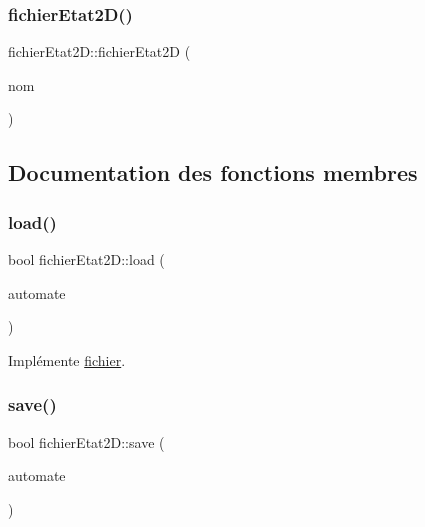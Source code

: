 \subsubsection{\texorpdfstring{fichier\+Etat2\+D()}{fichierEtat2D()}}
{\footnotesize\ttfamily fichier\+Etat2\+D\+::fichier\+Etat2D (\begin{DoxyParamCaption}\item[{const std\+::string}]{nom }\end{DoxyParamCaption})\hspace{0.3cm}{\ttfamily [inline]}}



\subsection{Documentation des fonctions membres}
\mbox{\label{classfichier_etat2_d_a1509a84b133ea169370a46301f74739e}} 
\subsubsection{\texorpdfstring{load()}{load()}}
{\footnotesize\ttfamily bool fichier\+Etat2\+D\+::load (\begin{DoxyParamCaption}\item[{const \mbox{\hyperlink{class_cellular_automata}{Cellular\+Automata}} $\ast$}]{automate }\end{DoxyParamCaption})\hspace{0.3cm}{\ttfamily [virtual]}}



Implémente \mbox{\hyperlink{classfichier_a6c246db929cf6532eb3f12c2b39574d5}{fichier}}.

\mbox{\label{classfichier_etat2_d_a0acba6c601772898383006d2c705a177}} 
\subsubsection{\texorpdfstring{save()}{save()}}
{\footnotesize\ttfamily bool fichier\+Etat2\+D\+::save (\begin{DoxyParamCaption}\item[{const \mbox{\hyperlink{class_cellular_automata}{Cellular\+Automata}} \&}]{automate }\end{DoxyParamCaption})\hspace{0.3cm}{\ttfamily [virtual]}}



